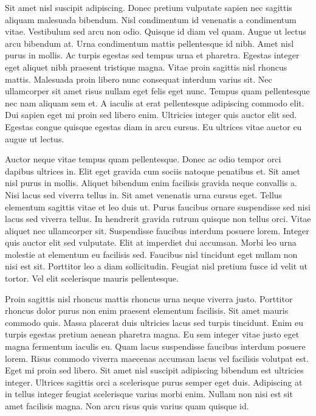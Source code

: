 \documentclass[a4paper,12pt]{article}
\begin{document}
\begin{multicols}{2}
Sit amet nisl suscipit adipiscing. Donec pretium vulputate sapien nec sagittis aliquam malesuada bibendum. Nisl condimentum id venenatis a condimentum vitae. Vestibulum sed arcu non odio. Quisque id diam vel quam. Augue ut lectus arcu bibendum at. Urna condimentum mattis pellentesque id nibh. Amet nisl purus in mollis. Ac turpis egestas sed tempus urna et pharetra. Egestas integer eget aliquet nibh praesent tristique magna. Vitae proin sagittis nisl rhoncus mattis. Malesuada proin libero nunc consequat interdum varius sit. Nec ullamcorper sit amet risus nullam eget felis eget nunc. Tempus quam pellentesque nec nam aliquam sem et. A iaculis at erat pellentesque adipiscing commodo elit. Dui sapien eget mi proin sed libero enim. Ultricies integer quis auctor elit sed. Egestas congue quisque egestas diam in arcu cursus. Eu ultrices vitae auctor eu augue ut lectus.

Auctor neque vitae tempus quam pellentesque. Donec ac odio tempor orci dapibus ultrices in. Elit eget gravida cum sociis natoque penatibus et. Sit amet nisl purus in mollis. Aliquet bibendum enim facilisis gravida neque convallis a. Nisi lacus sed viverra tellus in. Sit amet venenatis urna cursus eget. Tellus elementum sagittis vitae et leo duis ut. Purus faucibus ornare suspendisse sed nisi lacus sed viverra tellus. In hendrerit gravida rutrum quisque non tellus orci. Vitae aliquet nec ullamcorper sit. Suspendisse faucibus interdum posuere lorem. Integer quis auctor elit sed vulputate. Elit at imperdiet dui accumsan. Morbi leo urna molestie at elementum eu facilisis sed. Faucibus nisl tincidunt eget nullam non nisi est sit. Porttitor leo a diam sollicitudin. Feugiat nisl pretium fusce id velit ut tortor. Vel elit scelerisque mauris pellentesque.

Proin sagittis nisl rhoncus mattis rhoncus urna neque viverra justo. Porttitor rhoncus dolor purus non enim praesent elementum facilisis. Sit amet mauris commodo quis. Massa placerat duis ultricies lacus sed turpis tincidunt. Enim eu turpis egestas pretium aenean pharetra magna. Eu sem integer vitae justo eget magna fermentum iaculis eu. Quam lacus suspendisse faucibus interdum posuere lorem. Risus commodo viverra maecenas accumsan lacus vel facilisis volutpat est. Eget mi proin sed libero. Sit amet nisl suscipit adipiscing bibendum est ultricies integer. Ultrices sagittis orci a scelerisque purus semper eget duis. Adipiscing at in tellus integer feugiat scelerisque varius morbi enim. Nullam non nisi est sit amet facilisis magna. Non arcu risus quis varius quam quisque id.


\end{multicols}
\end{document}
